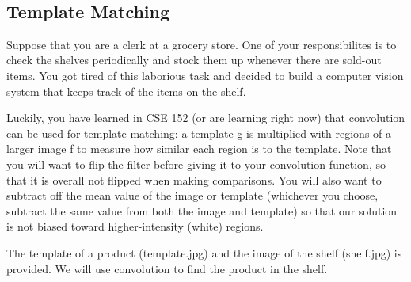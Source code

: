 \documentclass[11pt]{article}
\begin{document}
    \begin{center}
    \end{center}
    { \hspace*{\fill} \\}
    
    \subsection{Template Matching}\label{template-matching}

Suppose that you are a clerk at a grocery store. One of your
responsibilites is to check the shelves periodically and stock them up
whenever there are sold-out items. You got tired of this laborious task
and decided to build a computer vision system that keeps track of the
items on the shelf.

Luckily, you have learned in CSE 152 (or are learning right now) that
convolution can be used for template matching: a template g is
multiplied with regions of a larger image f to measure how similar each
region is to the template. Note that you will want to flip the filter
before giving it to your convolution function, so that it is overall not
flipped when making comparisons. You will also want to subtract off the
mean value of the image or template (whichever you choose, subtract the
same value from both the image and template) so that our solution is not
biased toward higher-intensity (white) regions.

The template of a product (template.jpg) and the image of the shelf
(shelf.jpg) is provided. We will use convolution to find the product in
the shelf.

 
\end{document}
